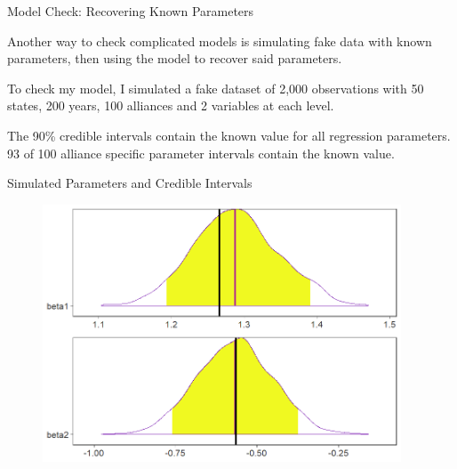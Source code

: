 \documentclass[12pt]{beamer}
\begin{document}

\begin{frame}{Model Check: Recovering Known Parameters}

Another way to check complicated models is simulating fake data with known parameters, then using the model to recover said parameters. 

To check my model, I simulated a fake dataset of 2,000 observations with 50 states, 200 years, 100 alliances and 2 variables at each level.

The 90\% credible intervals contain the known value for all regression parameters. 93 of 100 alliance specific parameter intervals contain the known value. 

\end{frame}



\begin{frame}{Simulated Parameters and Credible Intervals}


\begin{figure}
	\centering
		\includegraphics[width=0.95\textwidth]{sim-check-res.png}
\end{figure} 

\end{frame}


\end{document}
